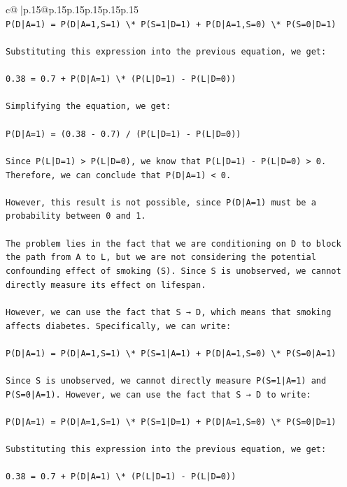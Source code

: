 \documentclass{article}
\begin{document}
{\begin{supertabular}{c@{$\;$}|p{.15\linewidth}@{}p{.15\linewidth}p{.15\linewidth}p{.15\linewidth}p{.15\linewidth}p{.15\linewidth}}
{{{\\ 
\texttt{P(D|A=1) = P(D|A=1,S=1) \textbackslash{}* P(S=1|D=1) + P(D|A=1,S=0) \textbackslash{}* P(S=0|D=1)} \\
\\ 
\texttt{Substituting this expression into the previous equation, we get:} \\
\\ 
\texttt{0.38 = 0.7 + P(D|A=1) \textbackslash{}* (P(L|D=1) {-} P(L|D=0))} \\
\\ 
\texttt{Simplifying the equation, we get:} \\
\\ 
\texttt{P(D|A=1) = (0.38 {-} 0.7) / (P(L|D=1) {-} P(L|D=0))} \\
\\ 
\texttt{Since P(L|D=1) > P(L|D=0), we know that P(L|D=1) {-} P(L|D=0) > 0. Therefore, we can conclude that P(D|A=1) < 0.} \\
\\ 
\texttt{However, this result is not possible, since P(D|A=1) must be a probability between 0 and 1.} \\
\\ 
\texttt{The problem lies in the fact that we are conditioning on D to block the path from A to L, but we are not considering the potential confounding effect of smoking (S). Since S is unobserved, we cannot directly measure its effect on lifespan.} \\
\\ 
\texttt{However, we can use the fact that S → D, which means that smoking affects diabetes. Specifically, we can write:} \\
\\ 
\texttt{P(D|A=1) = P(D|A=1,S=1) \textbackslash{}* P(S=1|A=1) + P(D|A=1,S=0) \textbackslash{}* P(S=0|A=1)} \\
\\ 
\texttt{Since S is unobserved, we cannot directly measure P(S=1|A=1) and P(S=0|A=1). However, we can use the fact that S → D to write:} \\
\\ 
\texttt{P(D|A=1) = P(D|A=1,S=1) \textbackslash{}* P(S=1|D=1) + P(D|A=1,S=0) \textbackslash{}* P(S=0|D=1)} \\
\\ 
\texttt{Substituting this expression into the previous equation, we get:} \\
\\ 
\texttt{0.38 = 0.7 + P(D|A=1) \textbackslash{}* (P(L|D=1) {-} P(L|D=0))} \\
}}}
\end{supertabular}}
\end{document}
